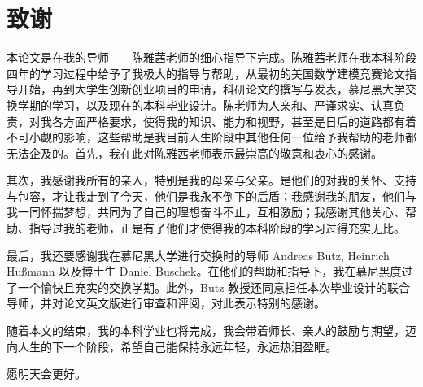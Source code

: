 \chapter*{致谢}


本论文是在我的导师——陈雅茜老师的细心指导下完成。陈雅茜老师在我本科阶段四年的学习过程中给予了我极大的指导与帮助，从最初的美国数学建模竞赛论文指导开始，再到大学生创新创业项目的申请，科研论文的撰写与发表，慕尼黑大学交换学期的学习，以及现在的本科毕业设计。陈老师为人亲和、严谨求实、认真负责，对我各方面严格要求，使得我的知识、能力和视野，甚至是日后的道路都有着不可小觑的影响，这些帮助是我目前人生阶段中其他任何一位给予我帮助的老师都无法企及的。首先，我在此对陈雅茜老师表示最崇高的敬意和衷心的感谢。

其次，我感谢我所有的亲人，特别是我的母亲与父亲。是他们的对我的关怀、支持与包容，才让我走到了今天，他们是我永不倒下的后盾；我感谢我的朋友，他们与我一同怀揣梦想，共同为了自己的理想奋斗不止，互相激励；我感谢其他关心、帮助、指导过我的老师，正是有了他们才使得我的本科阶段的学习过得充实无比。

最后，我还要感谢我在慕尼黑大学进行交换时的导师 Andreas Butz, Heinrich Hußmann 以及博士生 Daniel Buschek。在他们的帮助和指导下，我在慕尼黑度过了一个愉快且充实的交换学期。此外，Butz 教授还同意担任本次毕业设计的联合导师，并对论文英文版进行审查和评阅，对此表示特别的感谢。

随着本文的结束，我的本科学业也将完成，我会带着师长、亲人的鼓励与期望，迈向人生的下一个阶段，希望自己能保持永远年轻，永远热泪盈眶。

愿明天会更好。

\cleardoublepage
